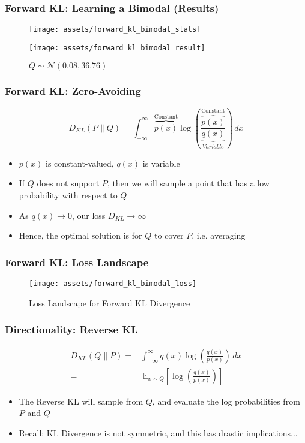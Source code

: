 \documentclass{beamer}
\begin{document}
\begin{frame}
  \frametitle{Forward KL: Learning a Bimodal (Results)}
  \begin{figure}
    \centering
    \texttt{[image: assets/forward\_kl\_bimodal\_stats]}
  \end{figure}
  \begin{figure}
    \centering
    \texttt{[image: assets/forward\_kl\_bimodal\_result]}
    \caption{$Q \sim \mathcal{N}(0.08, 36.76)$}
  \end{figure}
\end{frame}

\begin{frame}
  \frametitle{Forward KL: Zero-Avoiding}
  \begin{equation*}
    D_{KL} (P \parallel Q) = \int_{-\infty}^{\infty} \overbrace{p(x)}^{\text{Constant}}\log \left({\frac {\overbrace{p(x)}^{\text{Constant}}}{\underbrace{q(x)}_{Variable}}}\right)\,dx
  \end{equation*}
  \begin{itemize}
    \item $p(x)$ is constant-valued, $q(x)$ is variable
    \item If $Q$ does not support $P$, then we will sample a point that has a low
      probability with respect to $Q$
    \pause
    \item As $q(x) \to 0$, our loss $D_{KL} \to \infty$
    \pause
    \item Hence, the optimal solution is for $Q$ to cover $P$, i.e. averaging
  \end{itemize}
\end{frame}

\begin{frame}
  \frametitle{Forward KL: Loss Landscape}
  \begin{figure}
    \centering
    \texttt{[image: assets/forward\_kl\_bimodal\_loss]}
    \caption{Loss Landscape for Forward KL Divergence}
  \end{figure}
\end{frame}


\begin{frame}
  \frametitle{Directionality: Reverse KL}
  \begin{equation*}
    \begin{aligned}
    D_{KL} (Q \parallel P) =& \int_{-\infty}^{\infty} q(x)\log \left({\frac {q(x)}{p(x)}}\right)\,dx \\
    =& \; \mathbb{E}_{x \sim Q} \left[ \log \left( \frac{q(x)}{p(x)} \right) \right]
    \end{aligned}
  \end{equation*}
  \begin{itemize}
    \item The Reverse KL will sample from $Q$, and evaluate the log probabilities from $P$ and $Q$
    \item Recall: KL Divergence is not symmetric, and this has drastic implications...
  \end{itemize}
\end{frame}
\end{document}
